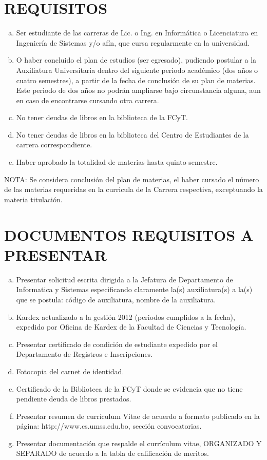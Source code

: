 \documentclass[letterpaper,11pt]{article}
\begin{document}
\section{REQUISITOS}
\begin{enumerate}[a)]
\item Ser estudiante de las carreras de Lic. o Ing. en Informática o Licenciatura en Ingeniería de Sistemas y/o afín, que cursa regularmente en la universidad.
\item O haber concluido el plan de estudios (ser egresado), pudiendo postular a la Auxiliatura Universitaria dentro del siguiente periodo académico (dos años o cuatro semestres), a partir de la fecha de conclusión de su plan de materias. Este periodo de dos años no podrán ampliarse bajo circunstancia alguna, aun en caso de encontrarse cursando otra carrera.
\item No tener deudas de libros en la biblioteca de la FCyT.
\item No tener deudas de libros en la biblioteca del Centro de Estudiantes de la carrera correspondiente.
\item Haber aprobado la totalidad de materias hasta quinto semestre.
\end{enumerate}

NOTA: Se considera conclusión del plan de materias, el haber cursado el número de las materias requeridas en la curricula de la Carrera respectiva, exceptuando la materia titulación.

\section{DOCUMENTOS REQUISITOS A PRESENTAR}
\begin{enumerate}[a)]
\item Presentar solicitud escrita dirigida a la Jefatura de Departamento de Informatica y Sistemas especificando claramente la(s) auxiliatura(s) a la(s) que se postula: código de auxiliatura, nombre de la auxiliatura.
\item Kardex actualizado a la gestión 2012 (periodos cumplidos a la fecha), expedido por Oficina de Kardex de la Facultad de Ciencias y Tecnología.
\item Presentar certificado de condición de estudiante expedido por el Departamento de Registros e Inscripciones.
\item Fotocopia del carnet de identidad.
\item Certificado de la Biblioteca de la FCyT donde se evidencia que no tiene pendiente deuda de libros prestados.
\item Presentar resumen de currículum Vitae de acuerdo a formato publicado en la página: http://www.cs.umss.edu.bo, sección convocatorias.
\item Presentar documentación que respalde el currículum vitae, ORGANIZADO Y SEPARADO de acuerdo a la tabla de calificación de meritos.
\end{enumerate}
\end{document}
